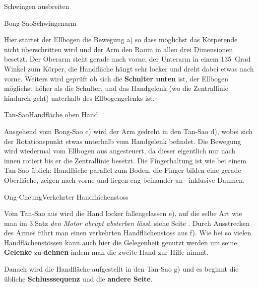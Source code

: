 \begin{WTSatz}{Schwingen ausbreiten}%

	
	\begin{WTSatzTeil}{Bong-Sao}{Schwingenarm}
		
		Hier startet der Ellbogen die Bewegung a) so dass m\"oglichst das K\"orperende nicht \"uberschritten wird und der Arm den Raum in allen drei Dimensionen besetzt. Der Oberarm steht gerade nach vorne, der Unterarm in einem 135~Grad Winkel zum K\"orper, die Handfl\"ache h\"angt sehr locker und dreht dabei etwas nach vorne. Weiters wird gepr\"uft ob sich die \textbf{Schulter unten} ist, der Ellbogen m\"oglichst h\"oher als die Schulter, und das Handgelenk (wo die Zentrallinie hindurch geht) unterhalb des Ellbogengelenks ist.
		
	\end{WTSatzTeil}
	\begin{WTSatzTeil}{Tan-Sao}{Handfl\"ache oben Hand}
		
		Ausgehend vom Bong-Sao c) wird der Arm gedreht in den Tan-Sao d), wobei sich der Rotationspunkt etwas unterhalb vom Handgelenk befindet. Die Bewegung wird wiedermal vom Ellbogen aus angesteuert, da dieser eigentlich nur nach innen rotiert bis er die Zentrallinie besetzt.
		Die Fingerhaltung ist wie bei einem Tan-Sao \"ublich: Handfl\"ache parallel zum Boden, die Finger bilden eine gerade Oberfl\"ache, zeigen nach vorne und liegen eng beinander an --inklusive Daumen.
		
	\end{WTSatzTeil}
	\begin{WTSatzTeil}{Ong-Cheung}{Verkehrter Handfl\"achenstoss}
		
		Vom Tan-Sao aus wird die Hand locker fallengelassen e), auf die selbe Art wie man im 3.Satz \textit{den Motor abrupt absterben l\"asst}, siehe Seite \pageref{LBL_motorabsterben}. Durch Ausstrecken des Armes f\"uhrt man einen verkehrten Handfl\"achenstoss aus f). Wie bei so vielen Handfl\"achenst\"ossen kann auch hier die Gelegenheit genutzt werden um seine \textbf{Gelenke} zu \textbf{dehnen} indem man die zweite Hand zur Hilfe nimmt.
		
		Danach wird die Handfl\"ache aufgestellt in den Tan-Sao g) und es beginnt die \"ubliche \textbf{Schlusssequenz} und die \textbf{andere Seite}.
		
	\end{WTSatzTeil}
\end{WTSatz}

